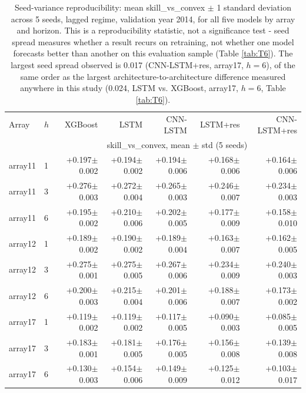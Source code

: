 \begin{table}[t]
  \centering
  \small
  \caption{Seed-variance reproducibility: mean skill\_vs\_convex $\pm$ 1 standard deviation across 5 seeds, lagged regime, validation year 2014, for all five models by array and horizon. This is a reproducibility statistic, not a significance test - seed spread measures whether a result recurs on retraining, not whether one model forecasts better than another on this evaluation sample (Table \ref{tab:T6}). The largest seed spread observed is 0.017 (CNN-LSTM+res, array17, $h=6$), of the same order as the largest architecture-to-architecture difference measured anywhere in this study (0.024, LSTM vs. XGBoost, array17, $h=6$, Table \ref{tab:T6}).}
  \label{tab:T3}
  \begin{tabular}{ll rrrrr}
    \toprule
    Array & $h$ & XGBoost & LSTM & CNN-LSTM & LSTM+res & CNN-LSTM+res \\
    & & \multicolumn{5}{c}{skill\_vs\_convex, mean $\pm$ std (5 seeds)} \\
    \midrule
    array11 & 1 & +0.197$\pm$0.002 & +0.194$\pm$0.002 & +0.194$\pm$0.006 & +0.168$\pm$0.006 & +0.164$\pm$0.006 \\
    array11 & 3 & +0.276$\pm$0.003 & +0.272$\pm$0.004 & +0.265$\pm$0.003 & +0.246$\pm$0.007 & +0.234$\pm$0.003 \\
    array11 & 6 & +0.195$\pm$0.002 & +0.210$\pm$0.006 & +0.202$\pm$0.005 & +0.177$\pm$0.009 & +0.158$\pm$0.010 \\
    array12 & 1 & +0.189$\pm$0.002 & +0.190$\pm$0.002 & +0.189$\pm$0.004 & +0.163$\pm$0.007 & +0.162$\pm$0.005 \\
    array12 & 3 & +0.275$\pm$0.001 & +0.275$\pm$0.005 & +0.267$\pm$0.006 & +0.234$\pm$0.009 & +0.240$\pm$0.003 \\
    array12 & 6 & +0.200$\pm$0.003 & +0.215$\pm$0.004 & +0.201$\pm$0.006 & +0.188$\pm$0.007 & +0.173$\pm$0.002 \\
    array17 & 1 & +0.119$\pm$0.002 & +0.119$\pm$0.002 & +0.117$\pm$0.005 & +0.090$\pm$0.003 & +0.085$\pm$0.005 \\
    array17 & 3 & +0.183$\pm$0.001 & +0.181$\pm$0.005 & +0.176$\pm$0.005 & +0.156$\pm$0.008 & +0.139$\pm$0.008 \\
    array17 & 6 & +0.130$\pm$0.003 & +0.154$\pm$0.006 & +0.149$\pm$0.009 & +0.125$\pm$0.012 & +0.103$\pm$0.017 \\
    \bottomrule
  \end{tabular}
\end{table}
